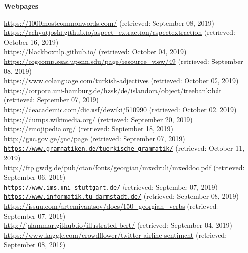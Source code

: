 \textbf{Webpages}

\url{https://1000mostcommonwords.com/} (retrieved: September 08, 2019) \\[2mm]
\url{https://achyutjoshi.github.io/aspect_extraction/aspectextraction} (retrieved: October 16, 2019) \\[2mm]
\url{https://blackboxnlp.github.io/} (retrieved: October 04, 2019) \\[2mm]
\url{https://cogcomp.seas.upenn.edu/page/resource_view/49} (retrieved: September 08, 2019) \\[2mm]
\url{https://www.colanguage.com/turkish-adjectives} (retrieved: October 02, 2019) \\[2mm]
\url{https://corpora.uni-hamburg.de/hzsk/de/islandora/object/treebank:hdt} (retrieved: September 07, 2019) \\[2mm]
\url{https://deacademic.com/dic.nsf/dewiki/510990} (retrieved: October 02, 2019) \\[2mm]
\url{https://dumps.wikimedia.org/} (retrieved: September 20, 2019) \\[2mm]
\url{https://emojipedia.org/} (retrieved: September 18, 2019) \\[2mm]
\url{http://gnc.gov.ge/gnc/page} (retrieved: September 07, 2019) \\[2mm]
\href{https://www.grammatiken.de/tuerkische-grammatik/tuerkisch-agglutinierende-sprache-suffix-anhaengen.php}{\texttt{https://www.grammatiken.de/tuerkische-grammatik/}} (retrieved: October 11, 2019) \\[2mm]
\url{http://ftp.gwdg.de/pub/ctan/fonts/georgian/mxedruli/mxeddoc.pdf} (retrieved: September 06, 2019) \\[2mm]
\href{https://www.ims.uni-stuttgart.de/forschung/ressourcen/korpora/tiger.html}{\texttt{https://www.ims.uni-stuttgart.de/}} (retrieved: September 07, 2019) \\[2mm]
\href{https://www.informatik.tu-darmstadt.de/ukp/research_6/data/argumentation_mining_1/ukp_sentential_argument_mining_corpus/index.en.jsp}{\texttt{https://www.informatik.tu-darmstadt.de/}} (retrieved: September 08, 2019)  \\[2mm]
\url{https://issuu.com/artemivantsov/docs/150_georgian_verbs} (retrieved: September 07, 2019) \\[2mm]
\url{http://jalammar.github.io/illustrated-bert/} (retrieved: September 04, 2019) \\[2mm]
\url{https://www.kaggle.com/crowdflower/twitter-airline-sentiment} (retrieved: September 08, 2019) \\[2mm]
